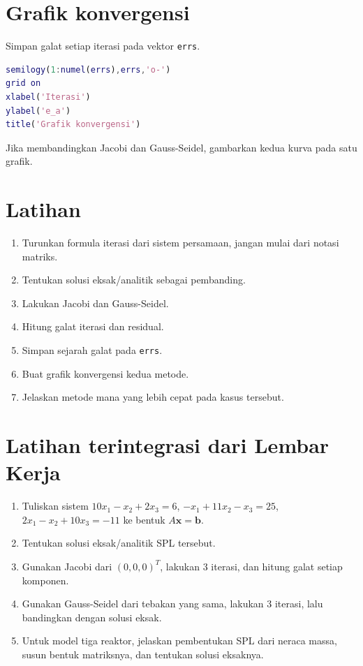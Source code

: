 \section{Grafik konvergensi}

Simpan galat setiap iterasi pada vektor \texttt{errs}.

\begin{lstlisting}[language=Matlab]
semilogy(1:numel(errs),errs,'o-')
grid on
xlabel('Iterasi')
ylabel('e_a')
title('Grafik konvergensi')
\end{lstlisting}

Jika membandingkan Jacobi dan Gauss-Seidel, gambarkan kedua kurva pada satu grafik.

\section{Latihan}

\begin{enumerate}
\item Turunkan formula iterasi dari sistem persamaan, jangan mulai dari notasi matriks.
\item Tentukan solusi eksak/analitik sebagai pembanding.
\item Lakukan Jacobi dan Gauss-Seidel.
\item Hitung galat iterasi dan residual.
\item Simpan sejarah galat pada \texttt{errs}.
\item Buat grafik konvergensi kedua metode.
\item Jelaskan metode mana yang lebih cepat pada kasus tersebut.
\end{enumerate}

\section{Latihan terintegrasi dari Lembar Kerja}

\begin{enumerate}
\item[\textbf{B3.1 (L1)}] Tuliskan sistem \(10x_1-x_2+2x_3=6\), \(-x_1+11x_2-x_3=25\), \(2x_1-x_2+10x_3=-11\) ke bentuk \(A\mathbf{x}=\mathbf{b}\).
\item[\textbf{B3.2 (L2)}] Tentukan solusi eksak/analitik SPL tersebut.
\item[\textbf{B3.3 (L3)}] Gunakan Jacobi dari \((0,0,0)^T\), lakukan 3 iterasi, dan hitung galat setiap komponen.
\item[\textbf{B3.4 (L4)}] Gunakan Gauss-Seidel dari tebakan yang sama, lakukan 3 iterasi, lalu bandingkan dengan solusi eksak.
\item[\textbf{B3.5 (L5)}] Untuk model tiga reaktor, jelaskan pembentukan SPL dari neraca massa, susun bentuk matriksnya, dan tentukan solusi eksaknya.
\end{enumerate}
